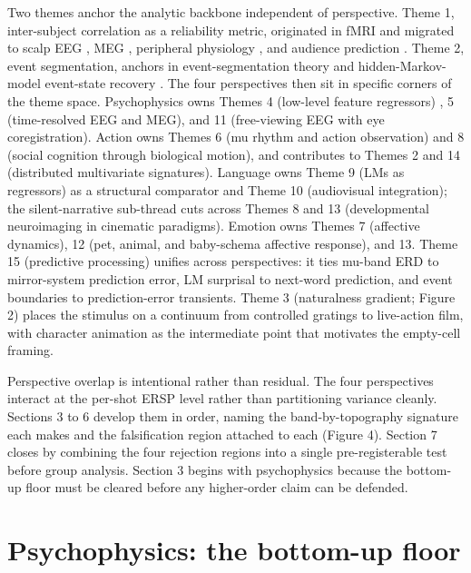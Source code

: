 \documentclass[preprint,12pt]{elsarticle}
\begin{document}
Two themes anchor the analytic backbone independent of perspective. Theme 1, inter-subject correlation as a reliability metric, originated in fMRI \cite{Hasson2004IntersubjectSO} and migrated to scalp EEG \cite{dmochowski2012correlated}, MEG \cite{Lankinen2014IntersubjectCO}, peripheral physiology \cite{Madsen2022CognitivePO}, and audience prediction \cite{Dmochowski2014AudiencePA}. Theme 2, event segmentation, anchors in event-segmentation theory and hidden-Markov-model event-state recovery \cite{zacks2007event,baldassano2017event,speer2007narrative,Ben-Yakov2018TheHF}. The four perspectives then sit in specific corners of the theme space. Psychophysics owns Themes 4 (low-level feature regressors) \cite{Adelson1985SpatiotemporalEM,Carandini2011NormalizationAA,Nishimoto2011ReconstructingVE}, 5 (time-resolved EEG and MEG), and 11 (free-viewing EEG with eye coregistration). Action owns Themes 6 (mu rhythm and action observation) \cite{hari1998action,pineda2005mu} and 8 (social cognition through biological motion), and contributes to Themes 2 and 14 (distributed multivariate signatures). Language owns Theme 9 (LMs as regressors) \cite{Goldstein2022SharedCP,Caucheteux2022BrainsAA} as a structural comparator and Theme 10 (audiovisual integration); the silent-narrative sub-thread cuts across Themes 8 and 13 (developmental neuroimaging in cinematic paradigms). Emotion owns Themes 7 (affective dynamics), 12 (pet, animal, and baby-schema affective response), and 13. Theme 15 (predictive processing) unifies across perspectives: it ties mu-band ERD to mirror-system prediction error, LM surprisal to next-word prediction, and event boundaries to prediction-error transients. Theme 3 (naturalness gradient; Figure 2) places the stimulus on a continuum from controlled gratings to live-action film, with character animation as the intermediate point that motivates the empty-cell framing.

Perspective overlap is intentional rather than residual. The four perspectives interact at the per-shot ERSP level rather than partitioning variance cleanly. Sections 3 to 6 develop them in order, naming the band-by-topography signature each makes and the falsification region attached to each (Figure 4). Section 7 closes by combining the four rejection regions into a single pre-registerable test before group analysis. Section 3 begins with psychophysics because the bottom-up floor must be cleared before any higher-order claim can be defended.

\section{Psychophysics: the bottom-up floor}
\end{document}
